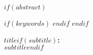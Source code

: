 \doublespacing

$if(abstract)$
  \begin{abstract}
    \noindent $abstract$
  \end{abstract}
  \vspace{\baselineskip}
  $if(keywords)$
    \indent {}
  $endif$
  \newpage
$endif$

\begin{center}
  \singlespacing
  \textbf{$title$$if(subtitle)$:\\$subtitle$$endif$}
\end{center}
